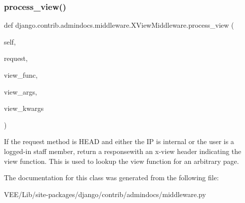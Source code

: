 \subsubsection{\texorpdfstring{process\+\_\+view()}{process\_view()}}
{\footnotesize\ttfamily def django.\+contrib.\+admindocs.\+middleware.\+X\+View\+Middleware.\+process\+\_\+view (\begin{DoxyParamCaption}\item[{}]{self,  }\item[{}]{request,  }\item[{}]{view\+\_\+func,  }\item[{}]{view\+\_\+args,  }\item[{}]{view\+\_\+kwargs }\end{DoxyParamCaption})}

\begin{DoxyVerb}If the request method is HEAD and either the IP is internal or the
user is a logged-in staff member, return a responsewith an x-view
header indicating the view function. This is used to lookup the view
function for an arbitrary page.
\end{DoxyVerb}
 

The documentation for this class was generated from the following file\+:\begin{DoxyCompactItemize}
\item 
V\+E\+E/\+Lib/site-\/packages/django/contrib/admindocs/middleware.\+py\end{DoxyCompactItemize}
